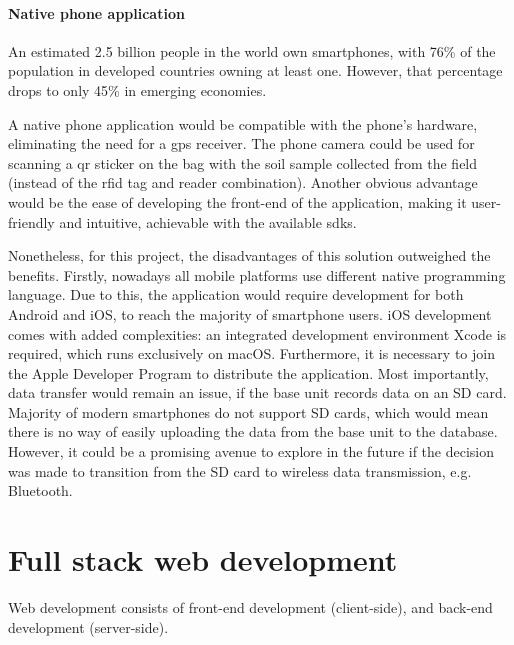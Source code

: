 
\paragraph{Native phone application}

An estimated 2.5 billion people in the world own smartphones, with 76\% of the population in developed countries owning at least one.\cite{taylor_silver_2019} However, that percentage drops to only 45\% in emerging economies.

A native phone application would be compatible with the phone's hardware, eliminating the need for a \gls{gps} receiver. The phone camera could be used for scanning a \gls{qr} sticker on the bag with the soil sample collected from the field (instead of the \gls{rfid} tag and reader combination). Another obvious advantage would be the ease of developing the front-end of the application, making it user-friendly and intuitive, achievable with the available \glspl{sdk}. 

Nonetheless, for this project, the disadvantages of this solution outweighed the benefits. Firstly, nowadays all mobile platforms use different native programming language. Due to this, the application would require development for both Android and iOS, to reach the majority of smartphone users. iOS development comes with added complexities: an integrated development environment Xcode is required, which runs exclusively on macOS. Furthermore, it is necessary to join the Apple Developer Program \cite{apple} to distribute the application. Most importantly, data transfer would remain an issue, if the base unit records data on an SD card. Majority of modern smartphones do not support SD cards, which would mean there is no way of easily uploading the data from the base unit to the database. However, it could be a promising avenue to explore in the future if the decision was made to transition from the SD card to wireless data transmission, e.g. Bluetooth.



\section{Full stack web development}
Web development consists of front-end development (client-side), and back-end development (server-side). 

